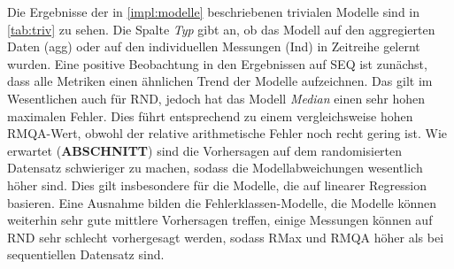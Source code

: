 \documentclass[
	12pt,
	a4paper,
	BCOR10mm,
	DIV14,
	listof=totoc,
	bibliography=totoc,
	headsepline
]{scrreprt}
\begin{document}
Die Ergebnisse der in \ref{impl:modelle} beschriebenen trivialen Modelle sind in \ref{tab:triv} zu sehen. Die Spalte \textit{Typ} gibt an, ob das Modell auf den aggregierten Daten (agg) oder auf den individuellen Messungen (Ind) in Zeitreihe gelernt wurden.
Eine positive Beobachtung in den Ergebnissen auf SEQ ist zunächst, dass alle Metriken einen ähnlichen Trend der  Modelle aufzeichnen.
Das gilt im Wesentlichen auch für RND, jedoch hat das Modell \textit{Median} einen sehr hohen maximalen Fehler. Dies führt entsprechend zu einem vergleichsweise hohen RMQA-Wert, obwohl der relative arithmetische Fehler noch recht gering ist.
Wie erwartet (\textbf{ABSCHNITT}) sind die Vorhersagen auf dem randomisierten Datensatz schwieriger zu machen, sodass die Modellabweichungen wesentlich höher sind.
Dies gilt insbesondere für die Modelle, die auf linearer Regression basieren.
Eine Ausnahme bilden die Fehlerklassen-Modelle, die Modelle können weiterhin sehr gute mittlere Vorhersagen treffen, einige Messungen können auf RND sehr schlecht vorhergesagt werden, sodass RMax und RMQA höher als bei sequentiellen Datensatz sind.
\end{document}
